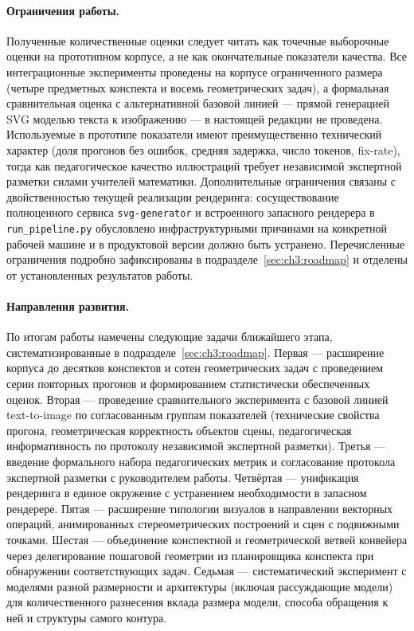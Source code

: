 \paragraph{Ограничения работы.}
Полученные количественные оценки следует читать как точечные выборочные
оценки на прототипном корпусе, а не как окончательные показатели качества.
Все интеграционные эксперименты проведены на корпусе ограниченного размера
(четыре предметных конспекта и восемь геометрических задач), а
формальная сравнительная оценка с альтернативной базовой линией ---
прямой генерацией SVG моделью текста к изображению --- в настоящей
редакции не проведена. Используемые в прототипе показатели имеют
преимущественно технический характер (доля прогонов без ошибок, средняя
задержка, число токенов, fix\nobreakdash-rate), тогда как педагогическое
качество иллюстраций требует независимой экспертной разметки силами
учителей математики. Дополнительные ограничения связаны с двойственностью
текущей реализации рендеринга: сосуществование полноценного сервиса
\texttt{svg-generator} и встроенного запасного рендерера в
\texttt{run\_pipeline.py} обусловлено инфраструктурными причинами на
конкретной рабочей машине и в продуктовой версии должно быть устранено.
Перечисленные ограничения подробно зафиксированы в
подразделе~\ref{sec:ch3:roadmap} и отделены от установленных результатов
работы.

\paragraph{Направления развития.}
По итогам работы намечены следующие задачи ближайшего этапа,
систематизированные в подразделе~\ref{sec:ch3:roadmap}. Первая ---
расширение корпуса до десятков конспектов и сотен геометрических задач
с проведением серии повторных прогонов и формированием статистически
обеспеченных оценок. Вторая --- проведение сравнительного эксперимента
с базовой линией text\nobreakdash-to\nobreakdash-image по согласованным
группам показателей (технические свойства прогона, геометрическая
корректность объектов сцены, педагогическая информативность по протоколу
независимой экспертной разметки). Третья --- введение формального набора
педагогических метрик и согласование протокола экспертной разметки с
руководителем работы. Четвёртая --- унификация рендеринга в единое
окружение с устранением необходимости в запасном рендерере. Пятая ---
расширение типологии визуалов в направлении векторных операций,
анимированных стереометрических построений и сцен с подвижными точками.
Шестая --- объединение конспектной и геометрической ветвей конвейера через
делегирование пошаговой геометрии из планировщика конспекта при
обнаружении соответствующих задач. Седьмая --- систематический эксперимент
с моделями разной размерности и архитектуры (включая рассуждающие модели)
для количественного разнесения вклада размера модели, способа обращения
к ней и структуры самого контура.


